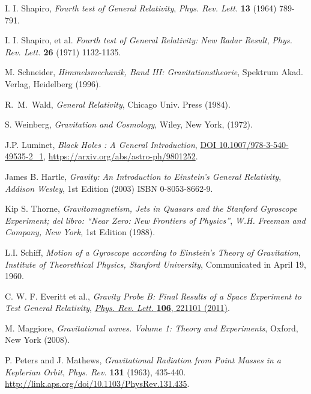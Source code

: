 \begin{thebibliography}{99}
 I. I. Shapiro,  {\em Fourth test of General Relativity}, {\sl Phys. Rev. Lett.} {\bf 13} (1964) 789-791.

 I. I. Shapiro, et al. {\em Fourth test of General Relativity: New Radar Result}, {\sl Phys. Rev. Lett.} {\bf 26} (1971) 1132-1135.

M. Schneider, {\em Himmelsmechanik, Band III:
Gravitationstheorie}, Spektrum Akad. Verlag, Heidelberg (1996).



 R.~M.~Wald, {\em General Relativity},  Chicago Univ. Press (1984).

 S. Weinberg, {\em Gravitation and Cosmology}, Wiley, New
York, (1972).

 J.P. Luminet, {\em Black Holes : A General Introduction}, \href{http://dx.doi.org/10.1007/978-3-540-49535-2\_1}{DOI 10.1007/978-3-540-49535-2\_1}, \url{https://arxiv.org/abs/astro-ph/9801252}.






James B. Hartle, {\it Gravity: An Introduction to Einstein's General Relativity},
{\sl Addison Wesley}, 1st Edition (2003) ISBN 0-8053-8662-9.

Kip S. Thorne, {\it Gravitomagnetism, Jets in Quasars and the Stanford Gyroscope Experiment; del libro: ``Near Zero: New Frontiers of Physics''},
{\sl W.H. Freeman and Company, New York}, 1st Edition (1988).

L.I. Schiff, {\it Motion of a Gyroscope according to Einstein's Theory of Gravitation},
{\sl Institute of Theorethical Physics, Stanford University}, Communicated in April 19, 1960.



C. W. F. Everitt et al., {\it Gravity Probe B: Final Results of a Space Experiment to Test General Relativity}, \href{http://dx.doi.org/10.1103/PhysRevLett.106.221101}{{\it Phys. Rev. Lett.} {\bf 106}, 221101 (2011)}.

 M. Maggiore, {\em  Gravitational waves. Volume 1: Theory and Experiments}, Oxford, New York (2008).

P. Peters and J. Mathews, {\em Gravitational Radiation from Point Masses in a Keplerian Orbit}, {\sl Phys. Rev.} {\bf 131} (1963), 435-440. \url{http://link.aps.org/doi/10.1103/PhysRev.131.435}.


\end{thebibliography}
